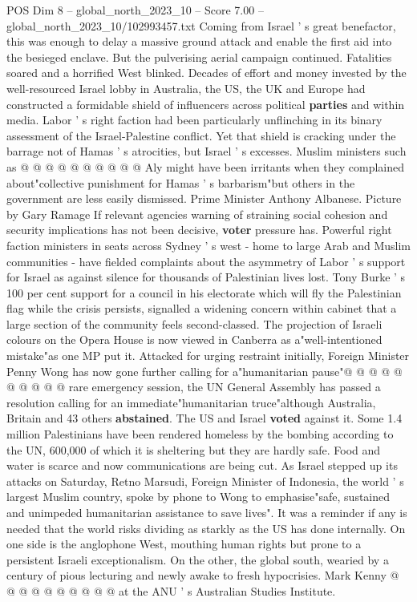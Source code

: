 \begin{textsample}{POS Dim 8 – global\_north\_2023\_10 – Score 7.00 – global\_north\_2023\_10/102993457.txt}
Coming from Israel ' s great benefactor, this was enough to delay a massive ground attack and enable the first aid into the besieged enclave.
But the pulverising aerial campaign continued.
Fatalities soared and a horrified West blinked.
Decades of effort and money invested by the well-resourced Israel lobby in Australia, the US, the UK and Europe had constructed a formidable shield of influencers across political \textbf{parties} and within media.
Labor ' s right faction had been particularly unflinching in its binary assessment of the Israel-Palestine conflict.
Yet that shield is cracking under the barrage not of Hamas ' s atrocities, but Israel ' s excesses.
Muslim ministers such as @ @ @ @ @ @ @ @ @ @ Aly might have been irritants when they complained about"collective punishment for Hamas ' s barbarism"but others in the government are less easily dismissed.
Prime Minister Anthony Albanese.
Picture by Gary Ramage If relevant agencies warning of straining social cohesion and security implications has not been decisive, \textbf{voter} pressure has.
Powerful right faction ministers in seats across Sydney ' s west - home to large Arab and Muslim communities - have fielded complaints about the asymmetry of Labor ' s support for Israel as against silence for thousands of Palestinian lives lost.
Tony Burke ' s 100 per cent support for a council in his electorate which will fly the Palestinian flag while the crisis persists, signalled a widening concern within cabinet that a large section of the community feels second-classed.
The projection of Israeli colours on the Opera House is now viewed in Canberra as a"well-intentioned mistake"as one MP put it.
Attacked for urging restraint initially, Foreign Minister Penny Wong has now gone further calling for a"humanitarian pause"@ @ @ @ @ @ @ @ @ @ rare emergency session, the UN General Assembly has passed a resolution calling for an immediate"humanitarian truce"although Australia, Britain and 43 others \textbf{abstained}.
The US and Israel \textbf{voted} against it.
Some 1.4 million Palestinians have been rendered homeless by the bombing according to the UN, 600,000 of which it is sheltering but they are hardly safe.
Food and water is scarce and now communications are being cut.
As Israel stepped up its attacks on Saturday, Retno Marsudi, Foreign Minister of Indonesia, the world ' s largest Muslim country, spoke by phone to Wong to emphasise"safe, sustained and unimpeded humanitarian assistance to save lives".
It was a reminder if any is needed that the world risks dividing as starkly as the US has done internally.
On one side is the anglophone West, mouthing human rights but prone to a persistent Israeli exceptionalism.
On the other, the global south, wearied by a century of pious lecturing and newly awake to fresh hypocrisies.
Mark Kenny @ @ @ @ @ @ @ @ @ @ at the ANU ' s Australian Studies Institute.

\end{textsample}
